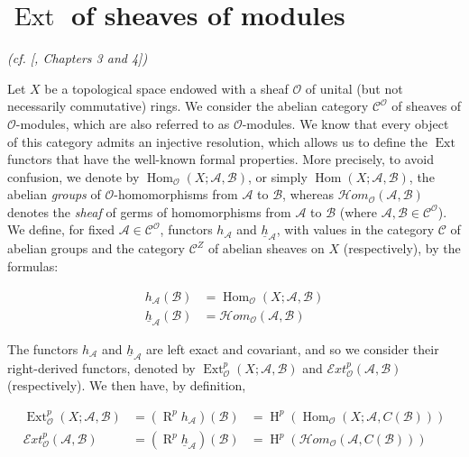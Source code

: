 \section{$\operatorname{Ext}$ of sheaves of modules}\label{fga1-1}

\emph{(cf. [\cite{Gro1957}, Chapters 3 and 4])}

Let $X$ be a topological space endowed with a sheaf $\mathcal{O}$ of unital (but not necessarily commutative) rings.
We consider the abelian category $\mathcal{C}^\mathcal{O}$ of sheaves of $\mathcal{O}$-modules, which are also referred to as $\mathcal{O}$-modules.
We know that every object of this category admits an injective resolution, which allows us to define the $\operatorname{Ext}$ functors that have the well-known formal properties.
More precisely, to avoid confusion, we denote by $\operatorname{Hom}_\mathcal{O}(X;\mathcal{A},\mathcal{B})$, or simply $\operatorname{Hom}(X;\mathcal{A},\mathcal{B})$, the abelian \emph{groups} of $\mathcal{O}$-homomorphisms from $\mathcal{A}$ to $\mathcal{B}$, whereas $\mathcal{H}om_\mathcal{O}(\mathcal{A},\mathcal{B})$ denotes the \emph{sheaf} of germs of homomorphisms from $\mathcal{A}$ to $\mathcal{B}$ (where $\mathcal{A},\mathcal{B}\in\mathcal{C}^\mathcal{O}$).
We define, for fixed $\mathcal{A}\in\mathcal{C}^\mathcal{O}$, functors $h_\mathcal{A}$ and $\underline{h}_\mathcal{A}$, with values in the category $\mathcal{C}$ of abelian groups and the category $\mathcal{C}^Z$ of abelian sheaves on $X$ (respectively), by the formulas:

\begin{equation}\tag{1.1}\label{fga1-equation-1.1}
    \begin{aligned}
        h_\mathcal{A}(\mathcal{B})             & = \operatorname{Hom}_\mathcal{O}(X;\mathcal{A},\mathcal{B}) \\
        \underline{h}_\mathcal{A}(\mathcal{B}) & = \mathcal{H}om_\mathcal{O}(\mathcal{A},\mathcal{B})
    \end{aligned}
\end{equation}

The functors $h_\mathcal{A}$ and $\underline{h}_\mathcal{A}$ are left exact and covariant, and so we consider their right-derived functors, denoted by $\operatorname{Ext}_\mathcal{O}^p(X;\mathcal{A},\mathcal{B})$ and $\mathcal{E}xt_\mathcal{O}^p(\mathcal{A},\mathcal{B})$ (respectively).
We then have, by definition,

\begin{equation}\tag{1.2}\label{fga1-equation-1.2}
    \begin{aligned}
        \operatorname{Ext}_\mathcal{O}^p(X;\mathcal{A},\mathcal{B}) & = (\operatorname{R}^p h_\mathcal{A})(\mathcal{B})             & = \operatorname{H}^p(\operatorname{Hom}_\mathcal{O}(X;\mathcal{A},C(\mathcal{B}))) \\
        \mathcal{E}xt_\mathcal{O}^p(\mathcal{A},\mathcal{B})   & = (\operatorname{R}^p \underline{h}_\mathcal{A})(\mathcal{B}) & = \operatorname{H}^p(\mathcal{H}om_\mathcal{O}(\mathcal{A},C(\mathcal{B})))
    \end{aligned}
\end{equation}


